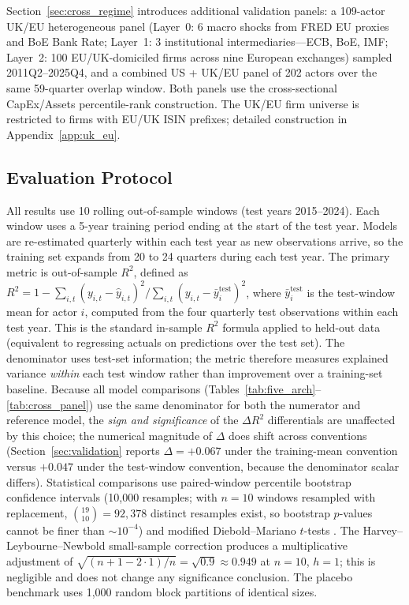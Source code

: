 \documentclass[11pt,a4paper]{article}
\begin{document}
Section~\ref{sec:cross_regime} introduces additional validation panels: a 109-actor UK/EU heterogeneous panel (Layer~0: 6 macro shocks from FRED EU proxies and BoE Bank Rate; Layer~1: 3 institutional intermediaries---ECB, BoE, IMF; Layer~2: 100 EU/UK-domiciled firms across nine European exchanges) sampled 2011Q2--2025Q4, and a combined US + UK/EU panel of 202 actors over the same 59-quarter overlap window. Both panels use the cross-sectional CapEx/Assets percentile-rank construction. The UK/EU firm universe is restricted to firms with EU/UK ISIN prefixes; detailed construction in Appendix~\ref{app:uk_eu}.

\subsection{Evaluation Protocol}

All results use 10 rolling out-of-sample windows (test years 2015--2024). Each window uses a 5-year training period ending at the start of the test year. Models are re-estimated quarterly within each test year as new observations arrive, so the training set expands from 20 to 24 quarters during each test year. The primary metric is out-of-sample $R^2$, defined as $R^2 = 1 - \sum_{i,t}(y_{i,t} - \hat{y}_{i,t})^2 / \sum_{i,t}(y_{i,t} - \bar{y}^{\mathrm{test}}_i)^2$, where $\bar{y}^{\mathrm{test}}_i$ is the test-window mean for actor $i$, computed from the four quarterly test observations within each test year. This is the standard in-sample $R^2$ formula applied to held-out data (equivalent to regressing actuals on predictions over the test set). The denominator uses test-set information; the metric therefore measures explained variance \emph{within} each test window rather than improvement over a training-set baseline. Because all model comparisons (Tables~\ref{tab:five_arch}--\ref{tab:cross_panel}) use the same denominator for both the numerator and reference model, the \emph{sign and significance} of the $\Delta R^2$ differentials are unaffected by this choice; the numerical magnitude of $\Delta$ does shift across conventions (Section~\ref{sec:validation} reports $\Delta = +0.067$ under the \citealt{stock2002forecasting} training-mean convention versus $+0.047$ under the test-window convention, because the denominator scalar differs). Statistical comparisons use paired-window percentile bootstrap confidence intervals (10{,}000 resamples; with $n = 10$ windows resampled with replacement, $\binom{19}{10} = 92{,}378$ distinct resamples exist, so bootstrap $p$-values cannot be finer than ${\sim}10^{-4}$) and modified Diebold--Mariano $t$-tests \citep{diebold1995comparing,harvey1997testing}. The Harvey--Leybourne--Newbold small-sample correction \citep{harvey1997testing} produces a multiplicative adjustment of $\sqrt{(n + 1 - 2 \cdot 1) / n} = \sqrt{0.9} \approx 0.949$ at $n = 10$, $h = 1$; this is negligible and does not change any significance conclusion. The placebo benchmark uses 1{,}000 random block partitions of identical sizes.
\end{document}
